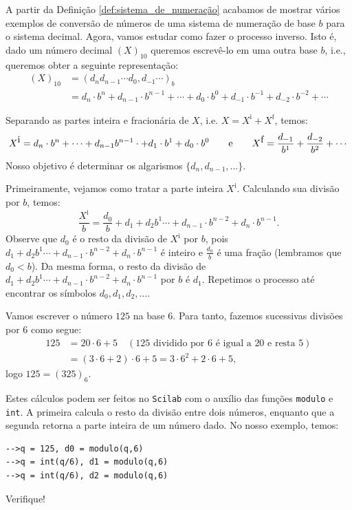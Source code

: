 \documentclass[main.tex]{subfiles}
\begin{document}
A partir da Definição \ref{def:sistema_de_numeração} acabamos de mostrar vários exemplos de conversão de números de uma sistema de numeração de base $b$ para o sistema decimal. Agora, vamos estudar como fazer o processo inverso. Isto é, dado um número decimal $(X)_{10}$ queremos escrevê-lo em uma outra base $b$, i.e., queremos obter a seguinte representação:
\begin{align*}
  (X)_{10} &= (d_nd_{n-1}\cdots d_0,d_{-1}\cdots)_{b} \\
  &= d_n\cdot b^{n}+d_{n-1}\cdot b^{n-1}+\cdots + d_0\cdot b^0+d_{-1}\cdot b^{-1}+d_{-2}\cdot b^{-2}+\cdots        
\end{align*}

Separando as partes inteira e fracionária de $X$, i.e. $X = X^{\mbox{i}} + X^{\mbox{f}}$, temos:
\begin{equation*}
X^{\mbox{i}} = d_n\cdot b^{n}+ \cdots+d_{n-1}b^{n-1} \cdot  +d_1\cdot b^1 +d_0\cdot b^0 \qquad \hbox{e}\qquad X^{\mbox{f}}
= \frac{d_{-1}}{b^1} + \frac{d_{-2}}{b^{2}} + \cdots  
\end{equation*}
Nosso objetivo é determinar os algarismos $\{d_n, d_{n-1}, ...\}$. 

Primeiramente, vejamos como tratar a parte inteira $X^{\mbox{i}}$. Calculando sua divisão por $b$, temos:
\begin{equation*}
\frac{X^{\mbox{i}}}{b}=   \frac{d_0}{b}+d_1+d_2 b^1\cdots+d_{n-1}\cdot b^{n-2} +d_n\cdot b^{n-1}.  
\end{equation*}
Observe que $d_0$ é o resto da divisão de $X^{\mbox{i}}$ por $b$, pois $d_1+d_2 b^1\cdots+d_{n-1}\cdot b^{n-2} +d_n\cdot b^{n-1}$ é inteiro e $\frac{d_0}{b}$ é uma fração (lembramos que $d_0<b$). Da mesma forma, o resto da divisão de $d_1+d_2 b^1\cdots+d_{n-1}\cdot b^{n-2} +d_n\cdot b^{n-1}$ por $b$ é $d_1$. Repetimos o processo até encontrar os símbolos $d_0, d_1, d_2, \ldots$.

\begin{ex} Vamos escrever o número $125$ na base $6$. Para tanto, fazemos sucessivas divisões por $6$ como segue:
  \begin{align*}
    125 &= 20\cdot 6 + 5\quad(\mbox{$125$ dividido por $6$ é igual a $20$ e resta $5$})\\
    &= (3\cdot 6 + 2)\cdot 6 + 5 = 3\cdot 6^2 + 2\cdot 6 + 5,
  \end{align*}
logo $125 = (325)_6$.

\ifisscilab
Estes cálculos podem ser feitos no \verb+Scilab+ com o auxílio das funções \verb'modulo' e \verb'int'. A primeira calcula o resto da divisão entre dois números, enquanto que a segunda retorna a parte inteira de um número dado. No nosso exemplo, temos:
\begin{verbatim}
-->q = 125, d0 = modulo(q,6)
-->q = int(q/6), d1 = modulo(q,6)
-->q = int(q/6), d2 = modulo(q,6)
\end{verbatim}
Verifique!
\fi
\end{ex}
\end{document}
